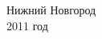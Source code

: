 \begin{titlepage}
    \vspace{3cm}

    \begin{center}
    {
        \fontsize{10pt}{3mm}  \selectfont
            Нижний Новгород \\
            2011 год
    }
    \end{center}

\end{titlepage}

